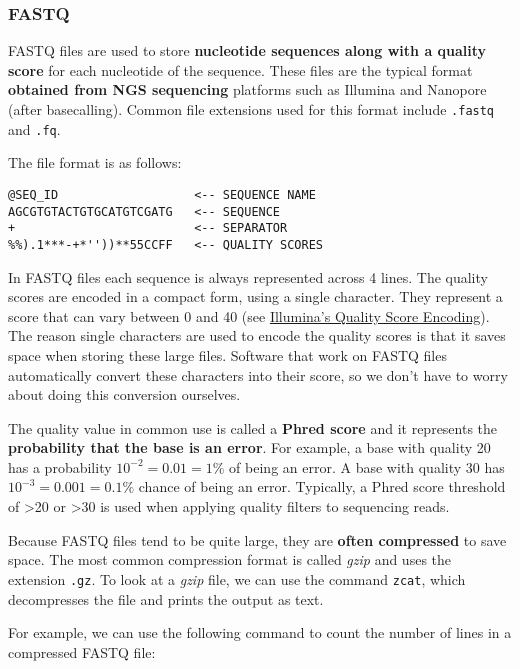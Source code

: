 \documentclass[
]{article}
\begin{document}
\subsubsection{FASTQ}\label{fastq}

FASTQ files are used to store \textbf{nucleotide sequences along with a
quality score} for each nucleotide of the sequence. These files are the
typical format \textbf{obtained from NGS sequencing} platforms such as
Illumina and Nanopore (after basecalling). Common file extensions used
for this format include \texttt{.fastq} and \texttt{.fq}.

The file format is as follows:

\begin{verbatim}
@SEQ_ID                   <-- SEQUENCE NAME
AGCGTGTACTGTGCATGTCGATG   <-- SEQUENCE
+                         <-- SEPARATOR
%%).1***-+*''))**55CCFF   <-- QUALITY SCORES
\end{verbatim}

In FASTQ files each sequence is always represented across 4 lines. The
quality scores are encoded in a compact form, using a single character.
They represent a score that can vary between 0 and 40 (see
\href{https://support.illumina.com/help/BaseSpace_OLH_009008/Content/Source/Informatics/BS/QualityScoreEncoding_swBS.htm}{Illumina's
Quality Score Encoding}). The reason single characters are used to
encode the quality scores is that it saves space when storing these
large files. Software that work on FASTQ files automatically convert
these characters into their score, so we don't have to worry about doing
this conversion ourselves.

The quality value in common use is called a \textbf{Phred score} and it
represents the \textbf{probability that the base is an error}. For
example, a base with quality 20 has a probability
\(10^{-2} = 0.01 = 1\%\) of being an error. A base with quality 30 has
\(10^{-3} = 0.001 = 0.1\%\) chance of being an error. Typically, a Phred
score threshold of \textgreater20 or \textgreater30 is used when
applying quality filters to sequencing reads.

Because FASTQ files tend to be quite large, they are \textbf{often
compressed} to save space. The most common compression format is called
\emph{gzip} and uses the extension \texttt{.gz}. To look at a
\emph{gzip} file, we can use the command \texttt{zcat}, which
decompresses the file and prints the output as text.

For example, we can use the following command to count the number of
lines in a compressed FASTQ file:
\end{document}
